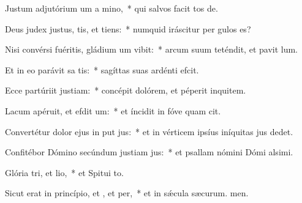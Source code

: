 \item Justum adjutórium um a mino,~* qui salvos facit tos de.
\item Deus judex justus, tis, et tiens:~* numquid iráscitur per gulos es?
\item Nisi convérsi fuéritis, gládium um vibit:~* arcum suum teténdit, et pavit lum.
\item Et in eo parávit sa tis:~* sagíttas suas ardénti efcit.
\item Ecce partúriit justiam:~* concépit dolórem, et péperit inquitem.
\item Lacum apéruit, et efdit um:~* et íncidit in fóve quam cit.
\item Convertétur dolor ejus in put jus:~* et in vérticem ipsíus iníquitas jus dedet.
\item Confitébor Dómino secúndum justiam jus:~* et psallam nómini Dómi alsimi.
\item Glória tri, et lio,~* et Spitui to.
\item Sicut erat in princípio, et , et per,~* et in sǽcula sæcurum. men.

